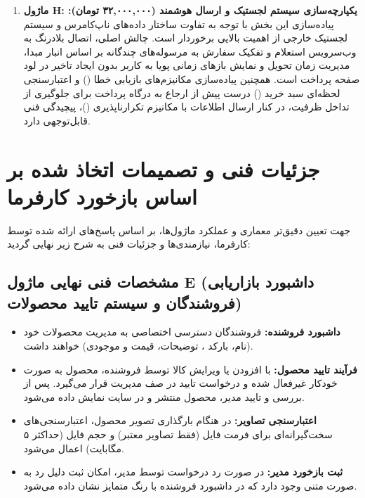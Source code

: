 \documentclass[11pt,a4paper]{article}
\begin{document}
\begin{enumerate}
    \item \textbf{ماژول H: یکپارچه‌سازی سیستم لجستیک و ارسال هوشمند (۳۲,۰۰۰,۰۰۰ تومان):}
    پیاده‌سازی این بخش با توجه به تفاوت ساختار داده‌های ناپ‌کامرس و سیستم لجستیک خارجی از اهمیت بالایی برخوردار است. چالش اصلی، اتصال بلادرنگ به وب‌سرویس استعلام و تفکیک سفارش به مرسوله‌های چندگانه بر اساس انبار مبدا، مدیریت زمان تحویل و نمایش بازهای زمانی پویا به کاربر بدون ایجاد تاخیر در لود صفحه پرداخت است. همچنین پیاده‌سازی مکانیزم‌های بازیابی خطا () و اعتبارسنجی لحظه‌ای سبد خرید () درست پیش از ارجاع به درگاه پرداخت برای جلوگیری از تداخل ظرفیت، در کنار ارسال اطلاعات با مکانیزم تکرارناپذیری ()، پیچیدگی فنی قابل‌توجهی دارد.
\end{enumerate}

\newpage
\section{جزئیات فنی و تصمیمات اتخاذ شده بر اساس بازخورد کارفرما}
جهت تعیین دقیق‌تر معماری و عملکرد ماژول‌ها، بر اساس پاسخ‌های ارائه شده توسط کارفرما، نیازمندی‌ها و جزئیات فنی به شرح زیر نهایی گردید:

\subsection{مشخصات فنی نهایی ماژول E (داشبورد بازاریابی فروشندگان و سیستم تایید محصولات)}
\begin{itemize}
    \item \textbf{داشبورد فروشنده:} فروشندگان دسترسی اختصاصی به مدیریت محصولات خود (نام، بارکد ، توضیحات، قیمت و موجودی) خواهند داشت.
    \item \textbf{فرآیند تایید محصول:} با افزودن یا ویرایش کالا توسط فروشنده، محصول به صورت خودکار غیرفعال شده و درخواست تایید در صف مدیریت قرار می‌گیرد. پس از بررسی و تایید مدیر، محصول منتشر و در سایت نمایش داده می‌شود.
    \item \textbf{اعتبارسنجی تصاویر:} در هنگام بارگذاری تصویر محصول، اعتبارسنجی‌های سخت‌گیرانه‌ای برای فرمت فایل (فقط تصاویر معتبر) و حجم فایل (حداکثر ۵ مگابایت) اعمال می‌شود.
    \item \textbf{ثبت بازخورد مدیر:} در صورت رد درخواست توسط مدیر، امکان ثبت دلیل رد به صورت متنی وجود دارد که در داشبورد فروشنده با رنگ متمایز نشان داده می‌شود.
\end{itemize}
\end{document}
